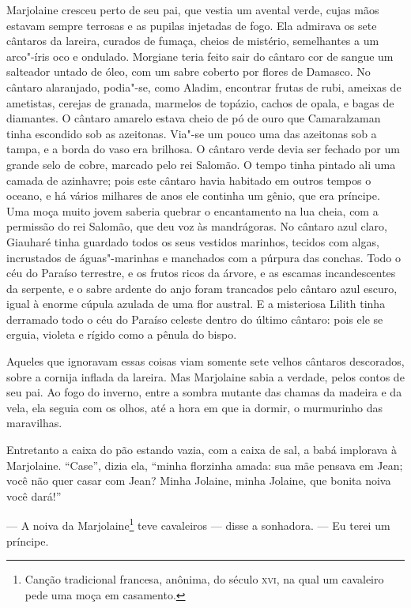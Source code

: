Marjolaine cresceu perto de seu pai, que vestia um avental verde, cujas
mãos estavam sempre terrosas e as pupilas injetadas de fogo. Ela admirava
os sete cântaros da lareira, curados de fumaça, cheios de mistério,
semelhantes a um arco"-íris oco e ondulado. Morgiane teria feito sair do
cântaro cor de sangue um salteador untado de óleo, com um sabre coberto
por flores de Damasco. No cântaro alaranjado, podia"-se, como Aladim,
encontrar frutas de rubi, ameixas de ametistas, cerejas de granada,
marmelos de topázio, cachos de opala, e bagas de diamantes. O cântaro
amarelo estava cheio de pó de ouro que Camaralzaman tinha escondido sob as
azeitonas. Via"-se um pouco uma das azeitonas sob a tampa, e a borda do
vaso era brilhosa. O cântaro verde devia ser fechado por um grande selo de
cobre, marcado pelo rei Salomão. O tempo tinha pintado ali uma camada de
azinhavre; pois este cântaro havia habitado em outros tempos o oceano, e
há vários milhares de anos ele continha um gênio, que era príncipe. Uma
moça muito jovem saberia quebrar o encantamento na lua cheia, com a
permissão do rei Salomão, que deu voz às mandrágoras. No cântaro azul
claro, Giauharé tinha guardado todos os seus vestidos marinhos, tecidos
com algas, incrustados de águas"-marinhas e manchados com a púrpura das
conchas. Todo o céu do Paraíso terrestre, e os frutos ricos da árvore, e
as escamas incandescentes da serpente, e o sabre ardente do anjo foram
trancados pelo cântaro azul escuro, igual à enorme cúpula azulada de uma
flor austral. E a misteriosa Lilith tinha derramado todo o céu do Paraíso
celeste dentro do último cântaro: pois ele se erguia, violeta e rígido
como a pênula do bispo.

Aqueles que ignoravam essas coisas viam somente sete velhos cântaros
descorados, sobre a cornija inflada da lareira. Mas Marjolaine sabia a
verdade, pelos contos de seu pai. Ao fogo do inverno, entre a sombra
mutante das chamas da madeira e da vela, ela seguia com os olhos, até a
hora em que ia dormir, o murmurinho das maravilhas.

Entretanto a caixa do pão estando vazia, com a caixa de sal, a babá
implorava à Marjolaine. “Case'', dizia ela, ``minha florzinha amada: sua mãe
pensava em Jean; você não quer casar com Jean? Minha Jolaine, minha
Jolaine, que bonita noiva você dará!”

--- A noiva da Marjolaine\footnote{ Canção tradicional francesa,
anônima, do século \textsc{xvi}, na qual um cavaleiro pede uma moça em casamento.}
teve cavaleiros --- disse a sonhadora. --- Eu terei um príncipe.

